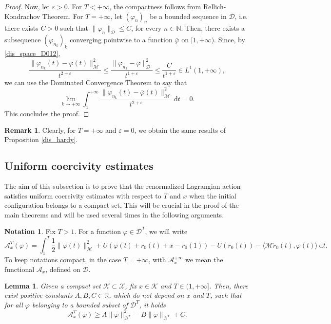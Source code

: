 \documentclass[a4paper,10pt]{amsart}
\newcommand{\numberset}{\mathbb}
\newcommand{\R}{\numberset{R}}
\newcommand{\ud}{\mathrm{d}}
\theoremstyle{plain}
\newtheorem{lem}[thm]{Lemma}
\theoremstyle{definition}
\newtheorem{rem}[thm]{Remark}
\newtheorem{notation}{Notation}
\numberwithin{equation}{section}
\numberwithin{thm}{section}
\begin{document}
\begin{proof}
    Now, let $\varepsilon>0$. For $T<+\infty$, the compactness follows from Rellich-Kondrachov Theorem. For $T=+\infty$, let $(\varphi_n)_n$ be a bounded sequence in $\mathcal{D}$, i.e. there exists $C>0$ such that $\|\varphi_n\|_\mathcal{D}\le C$, for every $n \in \mathbb N$. Then, there exists a subsequence $(\varphi_{n_k})_k$ converging pointwise to a function $\bar\varphi$ on $[1,+\infty)$. Since, by \eqref{dis_space_D012},
    \[
    \frac{\|\varphi_{n_k}(t) - \bar\varphi(t)\|_\mathcal{M}^2}{t^{2+\varepsilon}} \leq \frac{\|\varphi_{n_k}-\bar\varphi\|_\mathcal{D}^2}{t^{1+\varepsilon}} \le \frac{C}{t^{1+\varepsilon}}\in L^1(1,+\infty),
    \]
    we can use the Dominated Convergence Theorem to say that
    \[
    \lim_{k\rightarrow+\infty}\int_{1}^{+\infty} \frac{\|\varphi_{n_k}(t) - \bar\varphi(t)\|_\mathcal{M}^2}{t^{2+\varepsilon}}\ \ud t = 0.
    \]
    This concludes the proof.
\end{proof}

\begin{rem}
    Clearly, for $T=+\infty$ and $\varepsilon=0$, we obtain the same results of Proposition \ref{dis_hardy}.
\end{rem}


\subsection{Uniform coercivity estimates}\label{sec:coercivity_estimates}

The aim of this subsection is to prove that the renormalized Lagrangian action satisfies uniform coercivity estimates with respect to $T$ and $x$ when the initial configuration belongs to a compact set. This will be crucial in the proof of the main theorems and will be used several times in the following arguments.

\begin{notation}
Fix $T>1$. 
    For a function $\varphi\in \mathcal{D}^T$, we will write
    \[
    \mathcal{A}_{x}^T(\varphi) = \int_{1}^{T} \frac{1}{2}\|\dot{\varphi}(t)\|_\mathcal{M}^2 + U(\varphi(t) + r_0(t) + x - r_0(1)) - U(r_0(t)) - \langle \mathcal{M}\ddot{r}_0(t),\varphi(t)\rangle\ \ud t.
    \]
    To keep notations compact, in the case $T=+\infty$, with $\mathcal{A}_x^{+\infty}$ we mean the functional $\mathcal{A}_x$, defined on $\mathcal{D}$.
\end{notation}



\begin{lem}\label{lem:coercivity_estimates}
    Given a compact set $\mathcal{K}\subset\mathcal{X}$, fix $x\in\mathcal{K}$ and $T\in (1,+\infty]$. Then, there exist positive constants $A,B,C\in\R$, which do not depend on $x$ and $T$, such that for all $\varphi$ belonging to a bounded subset of $\mathcal{D}^T$, it holds  
    \begin{displaymath}\label{eq:unif_coerc_est}
    \mathcal{A}_{x}^T(\varphi) \geq A\|\varphi\|_{\mathcal{D}^T}^2 - B \|\varphi\|_{\mathcal{D}^T} + C.
    \end{displaymath}
\end{lem}
\end{document}
